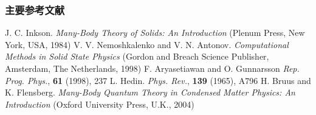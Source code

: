 \documentclass[cjk,slidestop,compress,mathserif,blue]{beamer}
\begin{document}
\begin{thebibliography}{99}
\frame
{
\frametitle{主要参考文献}
{\small
        \textrm{J. C. Inkson. \textit{Many-Body Theory of Solids: An Introduction} (Plenum Press, New York, USA, 1984)}
	\textrm{V. V. Nemoshkalenko and V. N. Antonov. \textit{Computational Methods in Solid State Physics} (Gordon and Breach Science Publisher, Amsterdam, The Netherlands, 1998)}
	\textrm{F. Aryasetiawan and O. Gunnarsson \textit{Rep. Prog. Phys.}, \textbf{61} (1998), 237}
	\textrm{L. Hedin. \textit{Phys. Rev.}, \textbf{139} (1965), A796}
	\textrm{H. Bruus and K. Flensberg. \textit{Many-Body Quantum Theory in Condensed Matter Physics: An Introduction} (Oxford University Press, U.K., 2004)}
}
\nocite*{}
}
\end{thebibliography}


\end{document}
